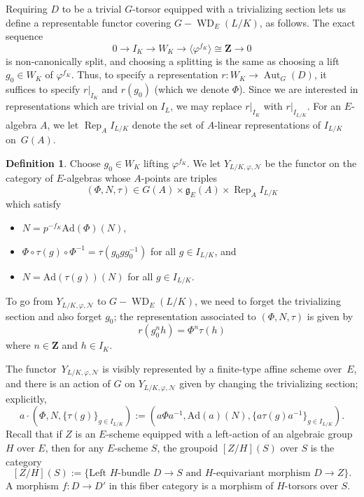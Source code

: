 \documentclass{amsart}
\renewcommand{\mathbb}{\mathbf}
\def\Ad{\mathrm{Ad}}
\def\fg{\mathfrak{g}}
\newcommand{\Rep}{\operatorname{Rep}}
\theoremstyle{definition}
\newtheorem{defn}[subsubsection]{Definition}
\theoremstyle{remark}
\newcommand{\mar}[1]{}
\newcommand{\mar}[1]{\marginpar{\raggedright\tiny squirrel #1}}
\newcommand{\Z}{\ZZ}
\newcommand{\ZZ}{{\mathbb Z}}
\DeclareMathOperator{\Aut}{Aut}
\DeclareMathOperator{\WD}{WD}
\begin{document}
Requiring $D$ to be a trivial $G$-torsor equipped with a trivializing section lets us define a representable functor covering $G-\WD_E(L/K)$, as follows.  The exact sequence
\[	0\rightarrow I_K\rightarrow W_K\rightarrow \langle
  \varphi^{f_K}\rangle \cong \Z\rightarrow 0	\]
 is non-canonically split, and choosing a splitting is the same as
 choosing a lift $g_0\in W_K$ of $\varphi^{f_K}$.  Thus, to specify a
 representation $r:W_K\rightarrow \Aut_G(D)$, it suffices to specify
 $r|_{I_K}$ and $r(g_0)$ (which we denote $\Phi$).  Since we are
 interested in representations which are trivial on $I_L$, we may
 replace $r|_{I_K}$ with $r|_{I_{L/K}}$. For an $E$-algebra $A$, we let $\Rep_A I_{L/K}$ denote
 the set of $A$-linear representations of $I_{L/K}$ on~$G(A)$.
\begin{defn}
Choose $g_0\in W_K$ lifting $\varphi^{f_K}$.
We let  $Y_{L/K,\varphi,\mathcal N}$ be the functor on the category of
  $E$-algebras whose $A$-points are triples %
  \[ (\Phi,N,\tau)\in G(A)\times \fg_E(A)\times\Rep_A I_{L/K} \]
  which satisfy
  \begin{itemize}
  \item $N=p^{-f_K}\Ad(\Phi)(N)$,
  \item $\Phi\circ\tau(g)\circ\Phi^{-1}=\tau(g_0gg_0^{-1})$ for all $g\in I_{L/K}$, and
  \item $N=\Ad(\tau(g))(N)$ for all $g\in I_{L/K}$.
  \end{itemize}
\end{defn}
To go from $Y_{L/K,\varphi,\mathcal N}$ to $G-\WD_E(L/K)$, we
need to forget the trivializing section and also forget $g_0$; the
representation associated to $(\Phi,N,\tau)$ is given
by \[r(g_0^nh)=\Phi^n\tau(h)\] where $n\in \Z$ and $h\in I_K$.  %

The functor~$Y_{L/K,\varphi,\mathcal N}$ is visibly represented by a finite-type affine
scheme over~$E$, and there is an action of $G$ on $Y_{L/K,\varphi,\mathcal N}$ given by changing the trivializing section; explicitly,
\[	a\cdot (\Phi,N,\{\tau(g)\}_{g\in I_{L/K}}):= (a\Phi a^{-1}, \Ad(a)(N), \{a\tau(g)a^{-1}\}_{g\in I_{L/K}}).	\]
Recall that if $Z$ is an $E$-scheme equipped with a left-action of an algebraic group $H$ over $E$, then for any $E$-scheme $S$, the groupoid $[Z/H](S)$ over $S$ is the category
\[	[Z/H](S):=\{\text{Left }H\text{-bundle }D\rightarrow S\text{ and }H\text{-equivariant morphism }D\rightarrow Z\}.	\]
A morphism $f:D\rightarrow D'$ in this fiber category is a morphism of $H$-torsors over $S$.
\end{document}

